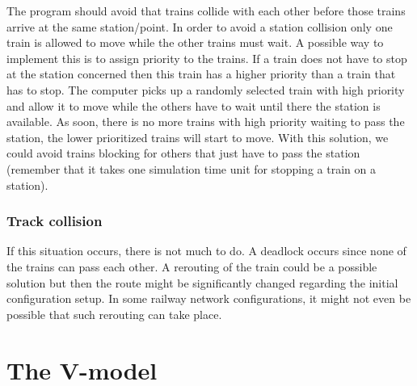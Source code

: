 \documentclass[10pt,a4paper]{article}
\begin{document}
The program should avoid that trains collide with each other before those trains arrive at the same station/point. In order to avoid a station collision only one train is allowed to move while the other trains must wait. A possible way to implement this is to assign priority to the trains. If a train does not have to stop at the station concerned then this train has a higher priority than a train that has to stop. The computer picks up a randomly selected train with high priority and allow it to move while the others have to wait until there the station is available. As soon, there is no more trains with high priority waiting to pass the station, the lower prioritized trains will start to move.
With this solution, we could avoid trains blocking for others that just have to pass the station (remember that it takes one simulation time unit for stopping a train on a station).
 
\subsubsection{Track collision}
 
If this situation occurs, there is not much to do. A deadlock occurs since none of the trains can pass each other.
A rerouting of the train could be a possible solution but then the route might be significantly changed regarding the initial configuration setup. In some railway network configurations, it might not even be possible that such rerouting can take place.
 

\section{The V-model}
 
\end{document}
